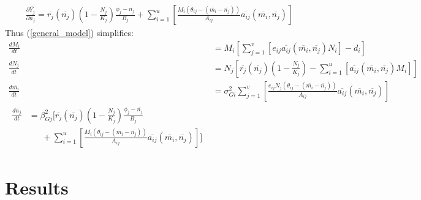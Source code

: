 \documentclass{amsart}
\theoremstyle{definition}
\theoremstyle{remark}
\numberwithin{equation}{section}
\begin{document}
\begin{equation}
	\label{model_2_prey_fitness_partial}
	\begin{aligned}
		\frac{\partial \overline{Y_j}}{\partial \overline{n_j}} = \overline{r_j}(\overline{n_j})\left(1 - \frac{N_j}{K_j}\right)\frac{\phi_j - \overline{n_j}}{B_j} + \sum\limits_{i = 1}^{u}\left[\frac{M_i(\theta_{ij} - (\overline{m_i} - \overline{n_j}))}{A_{ij}}\overline{a_{ij}}(\overline{m_i}, \overline{n_j})\right]
	\end{aligned}
\end{equation}
Thus (\ref{general_model}) simplifies:
\begin{subequations}
	\label{model2}
	\begin{align}
		\label{eq:model2_a}
		\frac{dM_i}{dt} &= M_i\left[\sum\limits_{j = 1}^{v}\left[e_{ij}\overline{a_{ij}}(\overline{m_i}, \overline{n_j})N_i\right] - d_i\right] \\[5px]
		\label{eq:model2_b}
		\frac{dN_j}{dt} &= N_j\left[\overline{r_j}(\overline{n_j})\left(1 - \frac{N_j}{K_j}\right) - \sum\limits_{i = 1}^{u}\left[\overline{a_{ij}}(\overline{m_i}, \overline{n_j})M_i\right]\right] \\[5px]
		\label{eq:model2_c}
		\frac{d\overline{m_i}}{dt} &= \sigma_{Gi}^2\sum\limits_{j = 1}^{v}\left[\frac{e_{ij}N_j(\theta_{ij} - (\overline{m_i} - \overline{n_j}))}{A_{ij}}\overline{a_{ij}}(\overline{m_i}, \overline{n_j})\right] \\[5px]
		\label{eq:model2_d}
		\begin{split}
			\frac{d\overline{n_j}}{dt} &= \beta_{Gj}^2\Bigg[\overline{r_j}(\overline{n_j})\left(1 - \frac{N_j}{K_j}\right)\frac{\phi_j - \overline{n_j}}{B_j} \\
			&\ \ \ \ \ \ \ + \sum\limits_{i = 1}^{u}\left[\frac{M_i(\theta_{ij} - (\overline{m_i} - \overline{n_j}))}{A_{ij}}\overline{a_{ij}}(\overline{m_i}, \overline{n_j})\right]\Bigg]
		\end{split}
	\end{align}
\end{subequations}


\section{Results}
\end{document}
